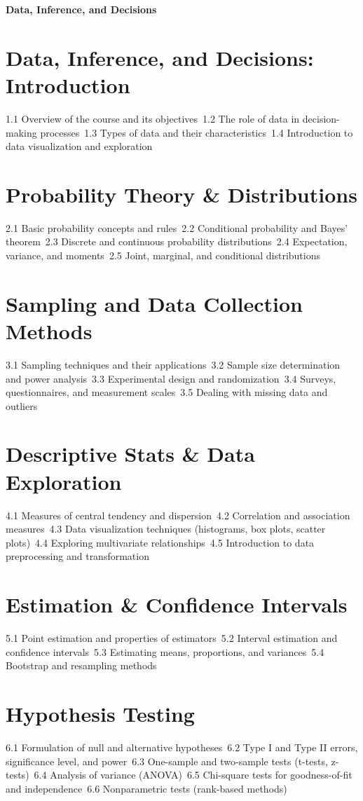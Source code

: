 {\LARGE \bf{Data, Inference, and Decisions}}
\section{Data, Inference, and Decisions: Introduction}
1.1 Overview of the course and its objectives\
1.2 The role of data in decision-making processes\
1.3 Types of data and their characteristics\
1.4 Introduction to data visualization and exploration\
\section{Probability Theory \& Distributions}
2.1 Basic probability concepts and rules\
2.2 Conditional probability and Bayes' theorem\
2.3 Discrete and continuous probability distributions\
2.4 Expectation, variance, and moments\
2.5 Joint, marginal, and conditional distributions\
\section{Sampling and Data Collection Methods}
3.1 Sampling techniques and their applications\
3.2 Sample size determination and power analysis\
3.3 Experimental design and randomization\
3.4 Surveys, questionnaires, and measurement scales\
3.5 Dealing with missing data and outliers\
\section{Descriptive Stats \& Data Exploration}
4.1 Measures of central tendency and dispersion\
4.2 Correlation and association measures\
4.3 Data visualization techniques (histograms, box plots, scatter plots)\
4.4 Exploring multivariate relationships\
4.5 Introduction to data preprocessing and transformation\
\section{Estimation \& Confidence Intervals}
5.1 Point estimation and properties of estimators\
5.2 Interval estimation and confidence intervals\
5.3 Estimating means, proportions, and variances\
5.4 Bootstrap and resampling methods\
\section{Hypothesis Testing}
6.1 Formulation of null and alternative hypotheses\
6.2 Type I and Type II errors, significance level, and power\
6.3 One-sample and two-sample tests (t-tests, z-tests)\
6.4 Analysis of variance (ANOVA)\
6.5 Chi-square tests for goodness-of-fit and independence\
6.6 Nonparametric tests (rank-based methods)\
